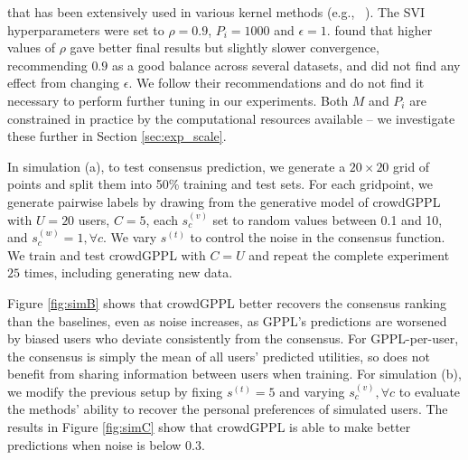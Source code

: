 that has been extensively used in various kernel methods (e.g., ~\citet{bors1996median,gretton2012optimal}).
The SVI hyperparameters were set to 
 $\rho=0.9$, $P_i=1000$ and $\epsilon=1$.
 \citet{hoffman2013stochastic} found that higher values of 
 $\rho$ gave better final results but slightly slower convergence, recommending
 $0.9$ as a good balance across several datasets, 
 and did not find any effect from changing $\epsilon$. 
We follow their recommendations and do not find it necessary to perform further
tuning in our experiments. 
 Both $M$ and $P_i$ are constrained
 in practice by the computational resources available -- we investigate these further in 
 Section \ref{sec:exp_scale}.

 
In simulation (a), to test consensus prediction,
we generate a $20\times 20$ grid of points
and split them into  50\% training and test sets.
For each gridpoint, we generate pairwise labels by drawing from the generative model of crowdGPPL
with $U=20$ users, $C=5$, each $s^{(v)}_c$ set
to random values between 0.1 and 10, and $s^{(w)}_c = 1, \forall c$.
We vary 
$s^{(t)}$ to control the noise in the consensus function. 
We train and test crowdGPPL with $C=U$ and repeat the complete experiment
$25$ times, including generating new data. 

Figure \ref{fig:simB} shows that crowdGPPL better recovers the 
consensus ranking than the baselines, even as noise increases, as 
GPPL's predictions are worsened by biased users who deviate
consistently from the consensus. 
For GPPL-per-user, the consensus is simply
the mean of all users' predicted utilities, 
so does not benefit from sharing information between users when training.
For simulation (b), we modify the previous setup 
by fixing $s^{(t)} = 5$ and varying $s^{(v)}_c,\forall c$
to evaluate the methods'
ability to recover the personal preferences of simulated users.
The results in Figure \ref{fig:simC} show that crowdGPPL is able to make better 
predictions when noise is below $0.3$.

